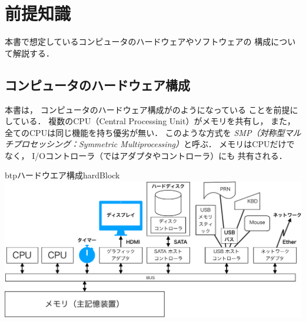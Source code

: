 \chapter{前提知識}
本書で想定しているコンピュータのハードウェアやソフトウェアの
構成について解説する．

\section{コンピュータのハードウェア構成}
本書は，
コンピュータのハードウェア構成がのようになっている
ことを前提にしている．
複数のCPU（Central Processing Unit）がメモリを共有し，
また，全てのCPUは同じ機能を持ち優劣が無い．
このような方式を
\emph{SMP（対称型マルチプロセッシング：Symmetric Multiprocessing）}と呼ぶ．
メモリはCPUだけでなく，
I/Oコントローラ（ではアダプタやコントローラ）にも
共有される．

\begin{myfig}{btp}{ハードウエア構成}{hardBlock}
  \includegraphics[scale=0.55]{Fig/hardBlock-crop.pdf}
\end{myfig}

